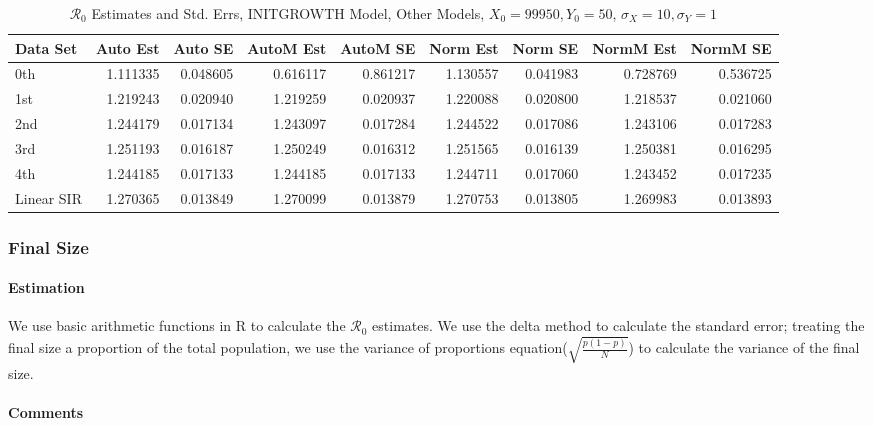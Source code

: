 \documentclass[12pt]{article}
\newcommand{\rr}{\ensuremath{\mathcal{R}_0}}
\begin{document}
\begin{table}[H]
	
	\caption{$\rr$ Estimates and Std. Errs, INITGROWTH Model,
		Other Models, $X_0 = 99950, Y_0 = 50$, 
		$\sigma_X = 10, \sigma_Y = 1$}
	\begin{footnotesize}
		\hskip -1cm
		\begin{tabular}{l|r|r|r|r|r|r|r|r}
			\hline
			Data Set & Auto Est & Auto SE & AutoM Est & AutoM SE & Norm Est & Norm SE & NormM Est & NormM SE\\
			\hline
			0th & 1.111335 & 0.048605 & 0.616117 & 0.861217 & 1.130557 & 0.041983 & 0.728769 & 0.536725\\
			\hline
			1st & 1.219243 & 0.020940 & 1.219259 & 0.020937 & 1.220088 & 0.020800 & 1.218537 & 0.021060\\
			\hline
			2nd & 1.244179 & 0.017134 & 1.243097 & 0.017284 & 1.244522 & 0.017086 & 1.243106 & 0.017283\\
			\hline
			3rd & 1.251193 & 0.016187 & 1.250249 & 0.016312 & 1.251565 & 0.016139 & 1.250381 & 0.016295\\
			\hline
			4th & 1.244185 & 0.017133 & 1.244185 & 0.017133 & 1.244711 & 0.017060 & 1.243452 & 0.017235\\
			\hline
			Linear SIR & 1.270365 & 0.013849 & 1.270099 & 0.013879 & 1.270753 & 0.013805 & 1.269983 & 0.013893\\
			\hline
		\end{tabular}
	\end{footnotesize}
\end{table}

\subsubsection{Final Size}

\paragraph{Estimation}

We use basic arithmetic functions in R to calculate the $\rr$ estimates. We use the delta method to calculate the standard error; treating the final size a proportion of the total population, we use the variance of proportions equation($ \sqrt{\frac{p(1-p)}{N}}$) to calculate the variance of the final size.

\paragraph{Comments}
\end{document}

